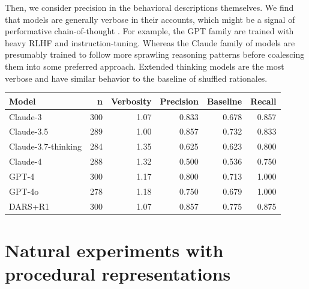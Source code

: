 \documentclass[11pt]{article}
\begin{document}
Then, we consider precision in the behavioral descriptions themselves. We find that models are generally verbose in their accounts, which might be a signal of performative chain-of-thought \cite{boppana2026reasoningtheaterdisentanglingmodel}. For example, the GPT family are trained with heavy RLHF and instruction-tuning. Whereas the Claude family of models are presumably trained to follow more sprawling reasoning patterns before coalescing them into some preferred approach.  Extended thinking models are the most verbose and have similar behavior to the baseline of shuffled rationales.

   \begin{table}[h]
  \centering
  \small
  \begin{tabular}{lrrrrr}
  \toprule
  \textbf{Model} & \textbf{n} & \textbf{Verbosity} & \textbf{Precision} &
  \textbf{Baseline} & \textbf{Recall} \\
  \midrule
  \rowcolor{claudebg} Claude-3            & 300 & 1.07 & 0.833 & 0.678 & 0.857 \\
  \rowcolor{claudebg} Claude-3.5          & 289 & 1.00 & 0.857 & 0.732 & 0.833 \\
  \rowcolor{claudebg} Claude-3.7-thinking & 284 & 1.35 & 0.625 & 0.623 & 0.800 \\
  \rowcolor{claudebg} Claude-4            & 288 & 1.32 & 0.500 & 0.536 & 0.750 \\
  \midrule
  \rowcolor{gptbg}    GPT-4               & 300 & 1.17 & 0.800 & 0.713 & 1.000 \\
  \rowcolor{gptbg}    GPT-4o              & 278 & 1.18 & 0.750 & 0.679 & 1.000 \\
  \midrule
   \rowcolor{owbg} DARS+R1 & 300 & 1.07 & 0.857 & 0.775 & 0.875 \\
  \bottomrule
  \end{tabular}
  \end{table}

\section{Natural experiments with procedural representations}
\end{document}
